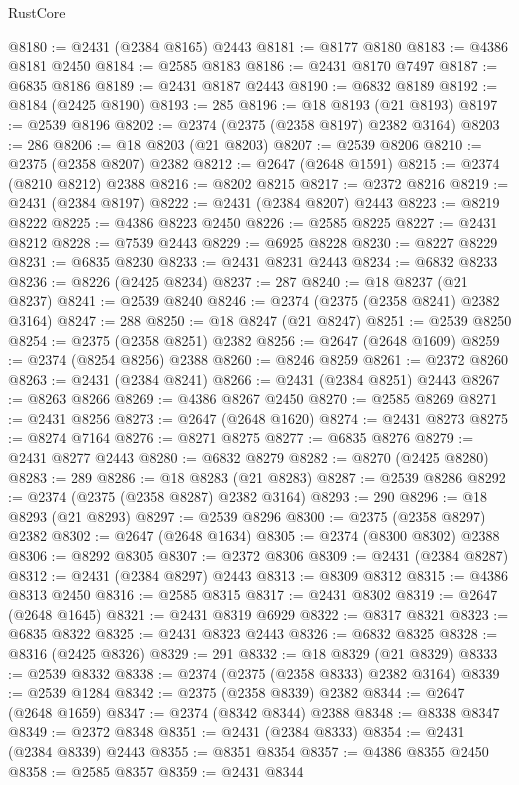 \begin{lexlean}{RustCore}
\begin{coremodule}
@8180 := @2431 (@2384 @8165) @2443
@8181 := @8177 @8180
@8183 := @4386 @8181 @2450
@8184 := @2585 @8183
@8186 := @2431 @8170 @7497
@8187 := @6835 @8186
@8189 := @2431 @8187 @2443
@8190 := @6832 @8189
@8192 := @8184 (@2425 @8190)
@8193 := 285
@8196 := @18 @8193 (@21 @8193)
@8197 := @2539 @8196
@8202 := @2374 (@2375 (@2358 @8197) @2382 @3164)
@8203 := 286
@8206 := @18 @8203 (@21 @8203)
@8207 := @2539 @8206
@8210 := @2375 (@2358 @8207) @2382
@8212 := @2647 (@2648 @1591)
@8215 := @2374 (@8210 @8212) @2388
@8216 := @8202 @8215
@8217 := @2372 @8216
@8219 := @2431 (@2384 @8197)
@8222 := @2431 (@2384 @8207) @2443
@8223 := @8219 @8222
@8225 := @4386 @8223 @2450
@8226 := @2585 @8225
@8227 := @2431 @8212
@8228 := @7539 @2443
@8229 := @6925 @8228
@8230 := @8227 @8229
@8231 := @6835 @8230
@8233 := @2431 @8231 @2443
@8234 := @6832 @8233
@8236 := @8226 (@2425 @8234)
@8237 := 287
@8240 := @18 @8237 (@21 @8237)
@8241 := @2539 @8240
@8246 := @2374 (@2375 (@2358 @8241) @2382 @3164)
@8247 := 288
@8250 := @18 @8247 (@21 @8247)
@8251 := @2539 @8250
@8254 := @2375 (@2358 @8251) @2382
@8256 := @2647 (@2648 @1609)
@8259 := @2374 (@8254 @8256) @2388
@8260 := @8246 @8259
@8261 := @2372 @8260
@8263 := @2431 (@2384 @8241)
@8266 := @2431 (@2384 @8251) @2443
@8267 := @8263 @8266
@8269 := @4386 @8267 @2450
@8270 := @2585 @8269
@8271 := @2431 @8256
@8273 := @2647 (@2648 @1620)
@8274 := @2431 @8273
@8275 := @8274 @7164
@8276 := @8271 @8275
@8277 := @6835 @8276
@8279 := @2431 @8277 @2443
@8280 := @6832 @8279
@8282 := @8270 (@2425 @8280)
@8283 := 289
@8286 := @18 @8283 (@21 @8283)
@8287 := @2539 @8286
@8292 := @2374 (@2375 (@2358 @8287) @2382 @3164)
@8293 := 290
@8296 := @18 @8293 (@21 @8293)
@8297 := @2539 @8296
@8300 := @2375 (@2358 @8297) @2382
@8302 := @2647 (@2648 @1634)
@8305 := @2374 (@8300 @8302) @2388
@8306 := @8292 @8305
@8307 := @2372 @8306
@8309 := @2431 (@2384 @8287)
@8312 := @2431 (@2384 @8297) @2443
@8313 := @8309 @8312
@8315 := @4386 @8313 @2450
@8316 := @2585 @8315
@8317 := @2431 @8302
@8319 := @2647 (@2648 @1645)
@8321 := @2431 @8319 @6929
@8322 := @8317 @8321
@8323 := @6835 @8322
@8325 := @2431 @8323 @2443
@8326 := @6832 @8325
@8328 := @8316 (@2425 @8326)
@8329 := 291
@8332 := @18 @8329 (@21 @8329)
@8333 := @2539 @8332
@8338 := @2374 (@2375 (@2358 @8333) @2382 @3164)
@8339 := @2539 @1284
@8342 := @2375 (@2358 @8339) @2382
@8344 := @2647 (@2648 @1659)
@8347 := @2374 (@8342 @8344) @2388
@8348 := @8338 @8347
@8349 := @2372 @8348
@8351 := @2431 (@2384 @8333)
@8354 := @2431 (@2384 @8339) @2443
@8355 := @8351 @8354
@8357 := @4386 @8355 @2450
@8358 := @2585 @8357
@8359 := @2431 @8344

\end{coremodule}
\end{lexlean}
